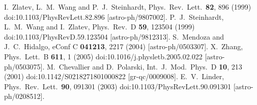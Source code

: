 \documentclass[aps,prd,amsmath,amssymb,showpacs,floats,floatfix,nofootinbib,reprint]{revtex4-1}
\begin{document}
\begin{thebibliography}{99}
  I.~Zlatev, L.~M.~Wang and P.~J.~Steinhardt,
  Phys.\ Rev.\ Lett.\  {\bf 82}, 896 (1999)
  doi:10.1103/PhysRevLett.82.896
  [astro-ph/9807002].
  P.~J.~Steinhardt, L.~M.~Wang and I.~Zlatev,
  Phys.\ Rev.\ D {\bf 59}, 123504 (1999)
  doi:10.1103/PhysRevD.59.123504
  [astro-ph/9812313].
  S.~Mendoza and J.~C.~Hidalgo,
  eConf C {\bf 041213}, 2217 (2004)
  [astro-ph/0503307].
  X.~Zhang,
  Phys.\ Lett.\ B {\bf 611}, 1 (2005)
  doi:10.1016/j.physletb.2005.02.022
  [astro-ph/0503075].
  M.~Chevallier and D.~Polarski,
  Int.\ J.\ Mod.\ Phys.\ D {\bf 10}, 213 (2001)
  doi:10.1142/S0218271801000822
  [gr-qc/0009008].
  E.~V.~Linder,
  Phys.\ Rev.\ Lett.\  {\bf 90}, 091301 (2003)
  doi:10.1103/PhysRevLett.90.091301
  [astro-ph/0208512].
  
\end{thebibliography}  
\end{document}
